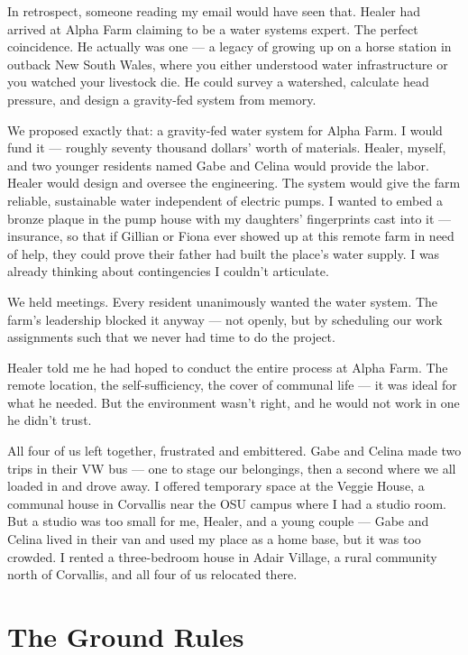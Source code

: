In retrospect, someone reading my email would have seen that. Healer had arrived at Alpha Farm claiming to be a water systems expert. The perfect coincidence. He actually was one --- a legacy of growing up on a horse station in outback New South Wales, where you either understood water infrastructure or you watched your livestock die. He could survey a watershed, calculate head pressure, and design a gravity-fed system from memory.

We proposed exactly that: a gravity-fed water system for Alpha Farm. I would fund it --- roughly seventy thousand dollars' worth of materials. Healer, myself, and two younger residents named Gabe and Celina would provide the labor. Healer would design and oversee the engineering. The system would give the farm reliable, sustainable water independent of electric pumps. I wanted to embed a bronze plaque in the pump house with my daughters' fingerprints cast into it --- insurance, so that if Gillian or Fiona ever showed up at this remote farm in need of help, they could prove their father had built the place's water supply. I was already thinking about contingencies I couldn't articulate.

We held meetings. Every resident unanimously wanted the water system. The farm's leadership blocked it anyway --- not openly, but by scheduling our work assignments such that we never had time to do the project.

Healer told me he had hoped to conduct the entire process at Alpha Farm. The remote location, the self-sufficiency, the cover of communal life --- it was ideal for what he needed. But the environment wasn't right, and he would not work in one he didn't trust.

All four of us left together, frustrated and embittered. Gabe and Celina made two trips in their VW bus --- one to stage our belongings, then a second where we all loaded in and drove away. I offered temporary space at the Veggie House, a communal house in Corvallis near the OSU campus where I had a studio room. But a studio was too small for me, Healer, and a young couple --- Gabe and Celina lived in their van and used my place as a home base, but it was too crowded. I rented a three-bedroom house in Adair Village, a rural community north of Corvallis, and all four of us relocated there.

\section*{The Ground Rules}
\label{pos02:the-ground-rules}

